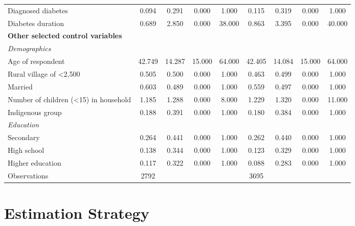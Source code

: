\documentclass[12pt,english,british]{article}
\begin{document}
\begin{table}[h!]
\begin{center}
\begin{adjustbox}{max width=\textwidth}
{\begin{tabular}{l*{2}{cccc}}
Diagnosed diabetes  &       0.094&       0.291&       0.000&       1.000&       0.115&       0.319&       0.000&       1.000\\
Diabetes duration   &       0.689&       2.850&       0.000&      38.000&       0.863&       3.395&       0.000&      40.000\\
\textbf{Other selected control variables} &&&&&&&& \\
\hspace*{10mm}\emph{Demographics}&&&&&&&& \\
Age of respondent   &      42.749&      14.287&      15.000&      64.000&      42.405&      14.084&      15.000&      64.000\\
Rural village of <2,500&       0.505&       0.500&       0.000&       1.000&       0.463&       0.499&       0.000&       1.000\\
Married             &       0.603&       0.489&       0.000&       1.000&       0.559&       0.497&       0.000&       1.000\\
Number of children (<15) in household&       1.185&       1.288&       0.000&       8.000&       1.229&       1.320&       0.000&      11.000\\
Indigenous group    &       0.188&       0.391&       0.000&       1.000&       0.180&       0.384&       0.000&       1.000\\
\hspace*{10mm}\emph{Education}&&&&&&&& \\
Secondary           &       0.264&       0.441&       0.000&       1.000&       0.262&       0.440&       0.000&       1.000\\
High school         &       0.138&       0.344&       0.000&       1.000&       0.123&       0.329&       0.000&       1.000\\
Higher education    &       0.117&       0.322&       0.000&       1.000&       0.088&       0.283&       0.000&       1.000\\
\midrule
Observations        &        2792&            &            &            &        3695&            &            &            \\
\bottomrule
\end{tabular}%
}
\end{adjustbox}
\end{center}
\end{table}  
  


\section{\label{sec:Estimation Strategy}Estimation Strategy}
\end{document}
